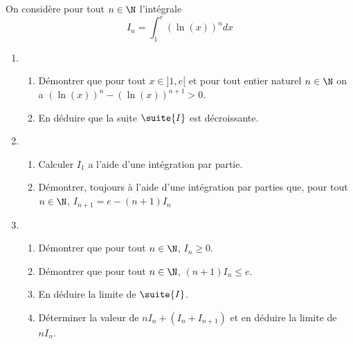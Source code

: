 \documentclass[a4paper, 11pt,reqno]{article}
\begin{document}

\begin{exercice}
On considère pour tout $n\in \N$ l'intégrale 
$$I_n = \int_1^e (\ln(x))^n dx$$

\begin{enumerate}
\item \begin{enumerate}
\item Démontrer que pour tout $x\in ]1,e[ $ et pour tout entier naturel $n\in \N$ on  a $ (\ln(x))^n  - (\ln(x))^{n+1} >0$.
\item En déduire que la suite $\suite{I}$ est décroissante.
\end{enumerate}
\item \begin{enumerate}
\item Calculer $I_1$ a l'aide d'une intégration par partie. 
\item Démontrer, toujours à l'aide d'une intégration par parties que, pour tout $n\in \N$, $I_{n+1} = e- (n+1)I_n$
\end{enumerate}
\item \begin{enumerate}
\item Démontrer que pour tout $n\in \N$, $I_n\geq0$.
\item Démontrer que pour tout $n\in \N$, $(n+1) I_n\leq e$.
\item En déduire la limite de $\suite{I}$. 
\item Déterminer la valeur de $nI_n +(I_n+I_{n+1})$  et en déduire la limite de $nI_n$. 
\end{enumerate}
\end{enumerate}
\end{exercice}
\end{document}
